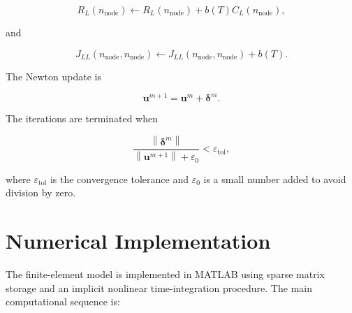 \documentclass[a4paper,12pt,oneside]{report}
\begin{document}
\begin{equation}
R_L(n_{\mathrm{node}})
\leftarrow
R_L(n_{\mathrm{node}})+b(T)C_L(n_{\mathrm{node}}),
\end{equation}

and

\begin{equation}
J_{LL}(n_{\mathrm{node}},n_{\mathrm{node}})
\leftarrow
J_{LL}(n_{\mathrm{node}},n_{\mathrm{node}})+b(T).
\end{equation}

The Newton update is

\begin{equation}
\mathbf{u}^{m+1}
=
\mathbf{u}^{m}
+
\boldsymbol{\delta}^{m}.
\end{equation}

The iterations are terminated when

\begin{equation}
\frac{
\left\|
\boldsymbol{\delta}^{m}
\right\|
}{
\left\|
\mathbf{u}^{m+1}
\right\|
+\varepsilon_{0}
}
<
\varepsilon_{\mathrm{tol}},
\label{eq:ch3_newton_convergence}
\end{equation}

where $\varepsilon_{\mathrm{tol}}$ is the convergence tolerance and
$\varepsilon_{0}$ is a small number added to avoid division by zero.

\section{Numerical Implementation}
\label{sec:ch3_implementation}

The finite-element model is implemented in MATLAB using sparse
matrix storage and an implicit nonlinear time-integration procedure.
The main computational sequence is:
\end{document}
